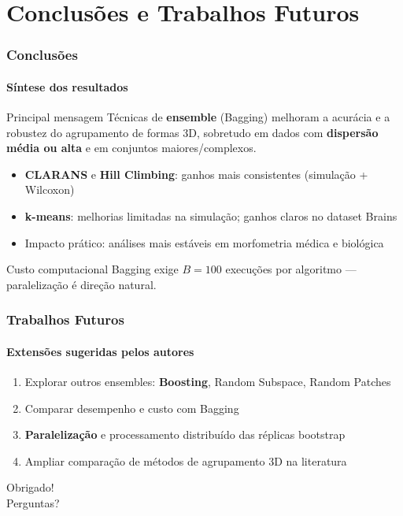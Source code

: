 \documentclass[brazilian,11pt]{beamer}
\begin{document}
\section[Conclusões]{Conclusões e Trabalhos Futuros}

\begin{frame}
    \frametitle{Conclusões}
    \framesubtitle{Síntese dos resultados}

    \begin{block}{Principal mensagem}
        Técnicas de \textbf{ensemble} (Bagging) melhoram a acurácia e a robustez do agrupamento de formas 3D, sobretudo em dados com \textbf{dispersão média ou alta} e em conjuntos maiores/complexos.
    \end{block}

    \begin{itemize}
        \item \textbf{CLARANS} e \textbf{Hill Climbing}: ganhos mais consistentes (simulação + Wilcoxon)
        \item \textbf{k-means}: melhorias limitadas na simulação; ganhos claros no dataset Brains
        \item Impacto prático: análises mais estáveis em morfometria médica e biológica
    \end{itemize}

    \begin{alertblock}{Custo computacional}
        Bagging exige $B=100$ execuções por algoritmo --- paralelização é direção natural.
    \end{alertblock}
\end{frame}

\begin{frame}
    \frametitle{Trabalhos Futuros}
    \framesubtitle{Extensões sugeridas pelos autores}

    \begin{enumerate}
        \item Explorar outros ensembles: \textbf{Boosting}, Random Subspace, Random Patches
        \item Comparar desempenho e custo com Bagging
        \item \textbf{Paralelização} e processamento distribuído das réplicas bootstrap
        \item Ampliar comparação de métodos de agrupamento 3D na literatura
    \end{enumerate}

    \vspace{0.5em}
    \begin{center}
        \Large Obrigado!\\
        \normalsize Perguntas?
    \end{center}
\end{frame}
\end{document}
